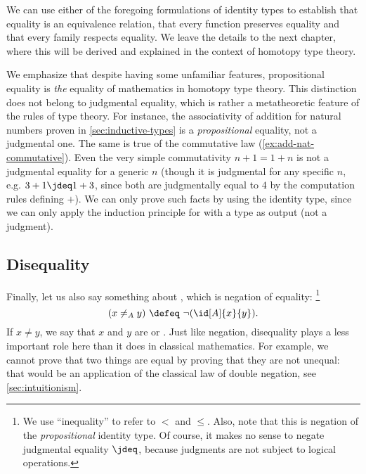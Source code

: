 We can use either of the foregoing formulations of identity types
to establish that equality is an equivalence relation, that every function preserves equality and that every family respects equality. We leave the details to the next chapter, where this will be derived  and explained in the context of homotopy type theory.

\begin{rmk}\label{rmk:propeq-vs-jdeq}
  We emphasize that despite having some unfamiliar features, propositional equality is \emph{the} equality of mathematics in homotopy type theory.
  This distinction does not belong to judgmental equality, which is rather a metatheoretic feature of the rules of type theory.
  For instance, the associativity of addition for natural numbers proven in \cref{sec:inductive-types} is a \emph{propositional} equality, not a judgmental one.
  The same is true of the commutative law (\cref{ex:add-nat-commutative}).
  Even the very simple commutativity $n+1=1+n$ is not a judgmental equality for a generic $n$ (though it is judgmental for any specific $n$, e.g. $3+1\jdeq 1+3$, since both are judgmentally equal to $4$ by the computation rules defining $+$).
  We can only prove such facts by using the identity type, since we can only apply the induction principle for \nat with a type as output (not a judgment).
\end{rmk}

\subsection{Disequality}
\label{sec:disequality}

Finally, let us also say something about ,
%
which is negation of equality:%
\footnote{We use ``inequality''
  to refer to $<$ and $\leq$. Also, note that this is negation of the \emph{propositional} identity type.
Of course, it makes no sense to negate judgmental equality $\jdeq$, because judgments are not subject to logical operations.}
%
\begin{equation*}
  (x \neq_A y) \ \defeq\ \lnot (\id[A]{x}{y}).
\end{equation*}
If $x\neq y$, we say that $x$ and $y$ are 
%
or .
%
Just like negation, disequality plays a less important role here than it does in classical
mathematics. For example, we cannot prove that two things are equal by proving that they
are not unequal: that would be an application of the classical law of double negation, see \cref{sec:intuitionism}.

